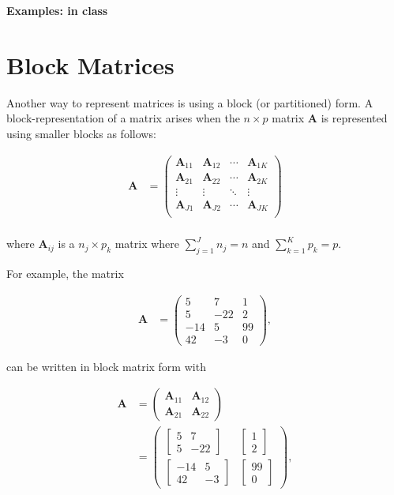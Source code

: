 \documentclass[
]{book}
\theoremstyle{definition}
\theoremstyle{definition}
\theoremstyle{definition}
\theoremstyle{definition}
\theoremstyle{remark}
\begin{document}
\textbf{Examples: in class}

\hypertarget{block-matrices}{%
\chapter{Block Matrices}\label{block-matrices}}

Another way to represent matrices is using a block (or partitioned) form. A block-representation of a matrix arises when the \(n \times p\) matrix \(\mathbf{A}\) is represented using smaller blocks as follows:

\[
\begin{aligned}
\mathbf{A} & = \begin{pmatrix} \mathbf{A}_{11} & \mathbf{A}_{12} & \cdots & \mathbf{A}_{1K} \\
\mathbf{A}_{21} & \mathbf{A}_{22} &  \cdots & \mathbf{A}_{2K} \\
\vdots & \vdots & \ddots & \vdots \\
\mathbf{A}_{J1} & \mathbf{A}_{J2} & \cdots & \mathbf{A}_{JK} \\
\end{pmatrix} \\
\end{aligned}
\]

where \(\mathbf{A}_{ij}\) is a \(n_j \times p_k\) matrix where \(\sum_{j=1}^J n_j = n\) and \(\sum_{k=1}^K p_k = p\).

For example, the matrix

\[
\begin{aligned}
\mathbf{A} & = \begin{pmatrix} 5 & 7 & 1 \\
5 & -22  & 2 \\
-14 & 5 & 99 \\
42 & -3 & 0\end{pmatrix},
\end{aligned}
\]

can be written in block matrix form with

\[
\begin{aligned}
\mathbf{A} & =
\begin{pmatrix} \mathbf{A}_{11} & \mathbf{A}_{12} \\
\mathbf{A}_{21} & \mathbf{A}_{22} \end{pmatrix} \\
& = \begin{pmatrix} \begin{bmatrix} 5 & 7 \\
5 & -22 \end{bmatrix} &
\begin{bmatrix} 1 \\
2 \end{bmatrix} \\
\begin{bmatrix}
-14 & 5 \\
42 & -3
\end{bmatrix} &
\begin{bmatrix} 99 \\ 0 \end{bmatrix}
\end{pmatrix},
\end{aligned}
\]
\end{document}
